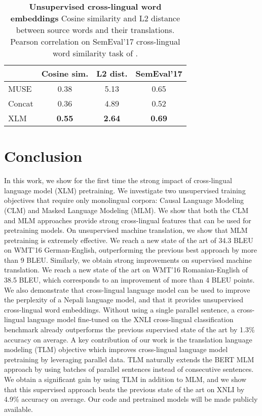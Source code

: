\documentclass[11pt,a4paper]{article}
\newcommand{\insertCrossLingualEmbeddingstable}{
    \begin{table}[t]
\centering
\begin{tabular}[b]{l|c|c|c}
        \toprule
        & Cosine sim. & L2 dist.      & SemEval'17 \\
        \midrule
        MUSE          & 0.38          & 5.13          & 0.65          \\
        Concat        & 0.36          & 4.89          & 0.52          \\
        XLM           & \textbf{0.55} & \textbf{2.64} & \textbf{0.69} \\
        \bottomrule
        \end{tabular}
        \caption{\textbf{Unsupervised cross-lingual word embeddings} Cosine similarity and L2 distance between source words and their translations. Pearson correlation on SemEval'17 cross-lingual word similarity task of \citet{camacho2017semeval}.
        \label{tab:word_embeddings}}
       \vspace{-0.5cm}
    \end{table}
}
\begin{document}
\insertCrossLingualEmbeddingstable

\section{Conclusion}
In this work, we show for the first time the strong impact of cross-lingual language model (XLM) pretraining. We investigate two unsupervised training objectives that require only monolingual corpora: Causal Language Modeling (CLM) and Masked Language Modeling (MLM). We show that both the CLM and MLM approaches provide strong cross-lingual features that can be used for pretraining models. On unsupervised machine translation, we show that MLM pretraining is extremely effective. We reach a new state of the art of 34.3 BLEU on WMT'16 German-English, outperforming the previous best approach by more than 9 BLEU. Similarly, we obtain strong improvements on supervised machine translation. We reach a new state of the art on WMT'16 Romanian-English of 38.5 BLEU, which corresponds to an improvement of more than 4 BLEU points. We also demonstrate that cross-lingual language model can be used to improve the perplexity of a Nepali language model, and that it provides unsupervised cross-lingual word embeddings. Without using a single parallel sentence, a cross-lingual language model fine-tuned on the XNLI cross-lingual classification benchmark already outperforms the previous supervised state of the art by 1.3\% accuracy on average. A key contribution of our work is the translation language modeling (TLM) objective which improves cross-lingual language model pretraining by leveraging parallel data. TLM naturally extends the BERT MLM approach by using batches of parallel sentences instead of consecutive sentences. We obtain a significant gain by using TLM in addition to MLM, and we show that this supervised approach beats the previous state of the art on XNLI by 4.9\% accuracy on average. Our code and pretrained models will be made publicly available.






\end{document}
